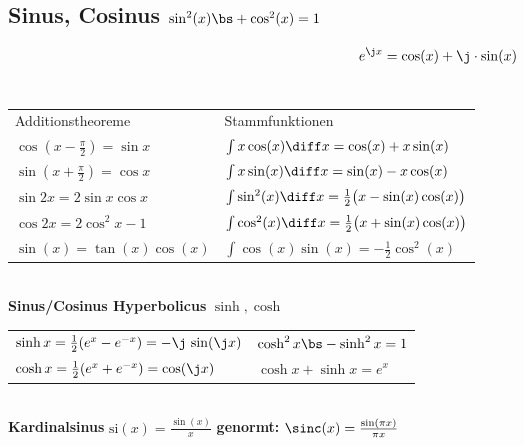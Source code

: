 \documentclass[fs, footer]{latex4ei}
\begin{document}
\begin{multicols*}{4}
{\subsection{Sinus, Cosinus \quad $\sin^2(x) \bs + \cos^2(x) = 1$}
\begin{equation*}
	e^{\j x} = \cos (x) + \j \cdot \sin(x)
\end{equation*}
\setlength{\tabcolsep}{4pt}
\\
\begin{tabular*}{\columnwidth}{@{\extracolsep\fill}ll@{}}
	Additionstheoreme &  Stammfunktionen\\
 	$\cos (x - \frac{\pi}{2}) = \sin x$ & $\int x \cos(x) \diff x = \cos(x) + x \sin(x)$\\
 	$\sin (x + \frac{\pi}{2}) = \cos x$ & $\int x \sin(x) \diff x = \sin(x) - x \cos(x)$\\
 	$\sin 2x = 2 \sin x \cos x $  & $\int \sin^2(x) \diff x = \frac12 \bigl(x - \sin(x)\cos(x) \bigr)$\\
 	$\cos 2x = 2\cos^2 x - 1$  & $\int \cos^2(x) \diff x = \frac12 \bigl(x + \sin(x)\cos(x) \bigr)$\\
 	$\sin(x) = \tan(x)\cos(x)$ & $\int \cos(x)\sin(x) = -\frac12 \cos^2(x)$ \\
\end{tabular*}\\[1em]
	\textbf{Sinus/Cosinus Hyperbolicus} $\sinh, \cosh$\\
	\begin{tabular*}{\columnwidth}{@{\extracolsep\fill}ll@{}}
	$\sinh x = \frac{1}{2}(e^x -e^{-x})= - \j \, \sin(\j x)$ & $\cosh^2 x  \bs - \sinh^2 x = 1$\\
	$\cosh x  = \frac{1}{2}(e^x +e^{-x})= \cos(\j x)$ & $\cosh x + \sinh x = e^{x}$\\
	\end{tabular*}\\
	\textbf{Kardinalsinus} $\mathrm{si}(x) = \frac{\sin(x)}{x}$ \qquad \textbf{genormt:} $\sinc(x) = \frac{\sin(\pi x)}{\pi x}$
}


\end{multicols*}
\end{document}
